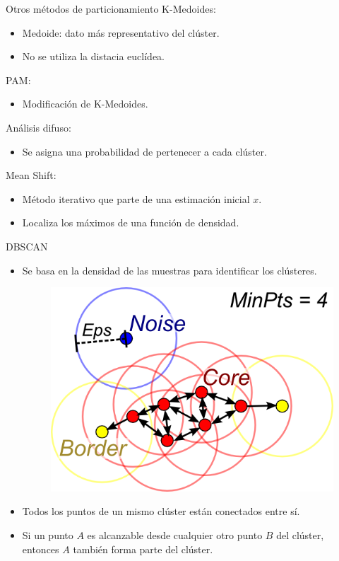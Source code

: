 \documentclass[spanish]{beamer}
\begin{document}
\begin{frame}{Otros métodos de particionamiento}
K-Medoides:
\begin{itemize}
\item Medoide: dato más representativo del clúster.
\item No se utiliza la distacia euclídea.
\end{itemize}
PAM:
\begin{itemize}
\item Modificación de K-Medoides.
\end{itemize}
Análisis difuso:
\begin{itemize}
\item Se asigna una probabilidad de pertenecer a cada clúster.
\end{itemize}
Mean Shift:
\begin{itemize}
\item Método iterativo que parte de una estimación inicial $x$.
\item Localiza los máximos de una función de densidad.
 \end{itemize}
\end{frame}

\begin{frame}{DBSCAN}
\begin{itemize}
\item Se basa en la densidad de las muestras para identificar los clústeres.
  \begin{figure}[h]
\centering
\includegraphics[scale=1.]{dani/DBSCAN.png}
\end{figure}

\item Todos los puntos de un mismo clúster están conectados entre sí.
\item Si un punto $A$ es alcanzable desde cualquier otro punto $B$ del clúster, entonces $A$ también forma parte del clúster.
\end{itemize}

\end{frame}
\end{document}
